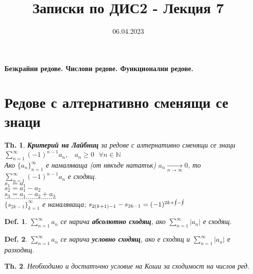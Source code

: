 \documentclass[12pt]{article}
\newtheorem{definition}{Def.}
\newtheorem{theorem}{Th.}
\newcommand{\spc}{\text{ }}
\begin{document}
	\color{white}
	\pagecolor{darkgray}
	\title{Записки по ДИС2 - Лекция 7}
	\date{06.04.2023}
	\maketitle
	\begin{center}
		\Large
		\textbf{Безкрайни редове. Числови редове. Функционални редове.}
	\end{center}
	
	\section*{Редове с алтернативно сменящи се знаци}
	\begin{theorem}
		\textit{\textbf{Критерий на Лайбниц} за редове с алтернативно сменящи се знаци} \\
		$\sum_{n=1}^{\infty} (-1)^{n-1}a_n$, $\spc a_n \geq 0 \spc\forall n \in \mathbb{N}$ \\
		
		Ако $\{a_n\}_{n=1}^\infty$ е намаляваща (от някъде нататък) $a_n \xrightarrow[n \to \infty]{} 0$, то $\sum_{n=1}^{\infty}(-1)^{n-1} a_n$ е сходящ. \\
		$s_1 = a_1$ \\
		$s_2 = a_1 - a_2$ \\
		$s_3 = a_1 - a_2 + a_3$ \\
		$...........................$ \\
		
		$\{s_{2k-1}\}_{k=1}^{\infty}$ е намаляваща; $s_{2(k+1)-1} - s_{2k-1} = (-1)^{2k+\cancel{1}-\cancel{1}}$
		
	\end{theorem}
	
	\begin{definition}
		$\sum_{n=1}^{\infty}a_n$ се нарича \textbf{абсолютно сходящ}, ако $\sum_{n=1}^{\infty}|a_n|$ е сходящ.
	\end{definition}

	\begin{definition}
		$\sum_{n=1}^{\infty}a_n$ се нарича \textbf{условно сходящ}, ако е сходящ и $\sum_{n=1}^{\infty}|a_n|$ е разходящ.
	\end{definition}

	\begin{theorem}
		Необходимо и достатъчно условие на Коши за сходимост на числов ред.
	\end{theorem}
\end{document}
